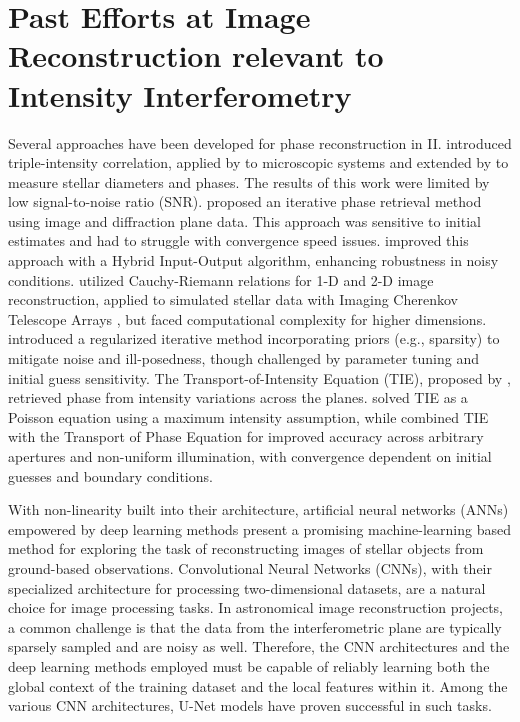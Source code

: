 \section{Past Efforts at Image Reconstruction relevant to Intensity Interferometry}\label{sec:past}
Several approaches have been developed for phase reconstruction in II. \cite{gamo1963triple} introduced triple-intensity correlation, applied by \cite{goldberger1963use} to microscopic systems and extended by \cite{sato1978imaging, sato1979computer, sato1981adaptive} to measure stellar diameters and phases. The results of this work were limited by low signal-to-noise ratio (SNR). \cite{GerchbergSaxton1972} proposed an iterative phase retrieval method using image and diffraction plane data. This approach was sensitive to initial estimates and had  to struggle with convergence speed issues. \cite{Fienup1982} improved this approach with a Hybrid Input-Output algorithm, enhancing robustness in noisy conditions. \cite{holmes2010two} utilized Cauchy-Riemann relations for 1-D and 2-D image reconstruction, applied to simulated stellar data with Imaging Cherenkov Telescope Arrays \citep{nunez2010stellar, nunez2012high, nunez2012imaging}, but faced computational complexity for higher dimensions. \cite{Li2014} introduced a regularized iterative method incorporating priors (e.g., sparsity) to mitigate noise and ill-posedness, though challenged by parameter tuning and initial guess sensitivity. The Transport-of-Intensity Equation (TIE), proposed by \cite{Teague1983}, retrieved phase from intensity variations across the planes. \cite{Zhang2020} solved TIE as a Poisson equation using a maximum intensity assumption, while \cite{Kirisits2024} combined TIE with the Transport of Phase Equation for improved accuracy across arbitrary apertures and non-uniform illumination, with convergence dependent on initial guesses and boundary conditions.

With non-linearity built into their architecture, artificial neural networks (ANNs) empowered by deep learning methods  present a promising machine-learning based method for exploring the task of reconstructing images of stellar objects from ground-based observations. Convolutional Neural Networks (CNNs), with their specialized architecture for processing two-dimensional datasets, are a natural choice for image processing tasks. In astronomical image reconstruction projects, a common challenge is that the data from the interferometric plane are typically sparsely sampled and are noisy as well. Therefore, the CNN architectures and the deep learning methods employed must be capable of reliably learning both the global context of the training dataset and the local features within it. Among the various CNN architectures, U-Net models \citep{ronneberger2015u} have proven successful in such tasks.

